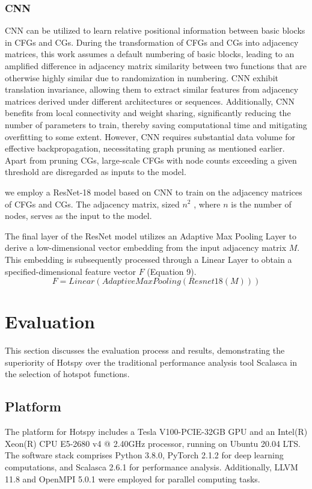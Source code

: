 \documentclass[lineno,sn-mathphys]{sn-jnl}%
\theoremstyle{thmstyleone}%
\theoremstyle{thmstyletwo}%
\theoremstyle{thmstylethree}%
\begin{document}
\subsubsection{CNN}
CNN can be utilized to learn relative positional information between basic blocks in CFGs and CGs.
During the transformation of CFGs and CGs into adjacency matrices, this work assumes a default numbering of basic blocks, leading to an amplified difference in adjacency matrix similarity between two functions that are otherwise highly similar due to randomization in numbering. CNN exhibit translation invariance, allowing them to extract similar features from adjacency matrices derived under different architectures or sequences. Additionally, CNN benefits from local connectivity and weight sharing, significantly reducing the number of parameters to train, thereby saving computational time and mitigating overfitting to some extent. However, CNN requires substantial data volume for effective backpropagation, necessitating graph pruning as mentioned earlier. Apart from pruning CGs, large-scale CFGs with node counts exceeding a given threshold are disregarded as inputs to the model.\par
we employ a ResNet-18 model based on CNN to train on the adjacency matrices of CFGs and CGs. The adjacency matrix, sized \(n^2\) , where \(n\) is the number of nodes, serves as the input to the model.\par
The final layer of the ResNet model utilizes an Adaptive Max Pooling Layer to derive a low-dimensional vector embedding from the input adjacency matrix \(M\). This embedding is subsequently processed through a Linear Layer to obtain a specified-dimensional feature vector \(F\) (Equation 9).
\begin{equation}
   F = Linear(AdaptiveMaxPooling(Resnet18(M)))
\end{equation}\par


 \section{Evaluation}
 This section discusses the evaluation process and results, demonstrating the superiority of Hotspy over the traditional performance analysis tool Scalasca in the selection of hotspot functions.
 \subsection{Platform} 
 The platform for Hotspy includes a Tesla V100-PCIE-32GB GPU and an Intel(R) Xeon(R) CPU E5-2680 v4 @ 2.40GHz processor, running on Ubuntu 20.04 LTS. The software stack comprises Python 3.8.0, PyTorch 2.1.2 for deep learning computations, and Scalasca 2.6.1 for performance analysis. Additionally, LLVM 11.8 and OpenMPI 5.0.1 were employed for parallel computing tasks.
\end{document}
